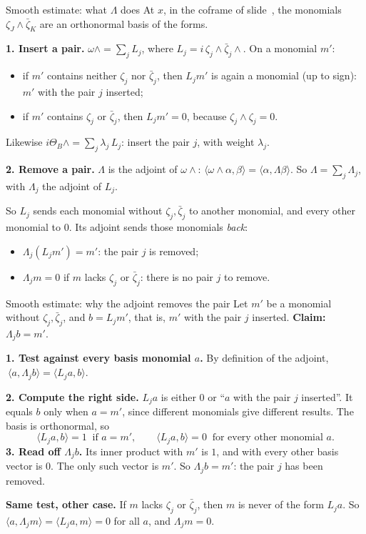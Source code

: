 \begin{frame}{Smooth estimate: what \(\Lambda\) does}
At \(x\), in the coframe of slide~\hyperlink{fr:kv-proof-both-forms-23}{\pageref{fr:kv-proof-both-forms-23}}, the monomials \(\zeta_J\wedge\bar\zeta_K\) are an orthonormal basis of the forms.
\par
\textbf{1. Insert a pair.} \(\omega\wedge=\sum_jL_j\), where \(L_j=i\,\zeta_j\wedge\bar\zeta_j\wedge\). On a monomial \(m'\):
\begin{itemize}
\item if \(m'\) contains neither \(\zeta_j\) nor \(\bar\zeta_j\), then \(L_jm'\) is again a monomial (up to sign): \(m'\) with the pair \(j\) inserted;
\item if \(m'\) contains \(\zeta_j\) or \(\bar\zeta_j\), then \(L_jm'=0\), because \(\zeta_j\wedge\zeta_j=0\).
\end{itemize}
Likewise \(i\Theta_B\wedge=\sum_j\lambda_j\,L_j\): insert the pair \(j\), with weight \(\lambda_j\).
\par\medskip
\textbf{2. Remove a pair.} \(\Lambda\) is the adjoint of \(\omega\wedge\): \(\langle\omega\wedge\alpha,\beta\rangle=\langle\alpha,\Lambda\beta\rangle\). So \(\Lambda=\sum_j\Lambda_j\), with \(\Lambda_j\) the adjoint of \(L_j\).
\par
So \(L_j\) sends each monomial without \(\zeta_j,\bar\zeta_j\) to another monomial, and every other monomial to \(0\). Its adjoint sends those monomials \emph{back}:
\begin{itemize}
\item \(\Lambda_j(L_jm')=m'\): the pair \(j\) is removed;
\item \(\Lambda_jm=0\) if \(m\) lacks \(\zeta_j\) or \(\bar\zeta_j\): there is no pair \(j\) to remove.
\end{itemize}
\end{frame}

\begin{frame}{Smooth estimate: why the adjoint removes the pair}
Let \(m'\) be a monomial without \(\zeta_j,\bar\zeta_j\), and \(b=L_jm'\), that is, \(m'\) with the pair \(j\) inserted.
\textbf{Claim:} \(\Lambda_jb=m'\).
\par\medskip
\textbf{1. Test against every basis monomial \(a\).} By definition of the adjoint,
\(\ \langle a,\Lambda_jb\rangle=\langle L_ja,b\rangle .\)
\par\medskip
\textbf{2. Compute the right side.} \(L_ja\) is either \(0\) or ``\(a\) with the pair \(j\) inserted''.
It equals \(b\) only when \(a=m'\), since different monomials give different results. The basis is orthonormal, so
\[
\langle L_ja,b\rangle=1\ \text{ if } a=m',
\qquad
\langle L_ja,b\rangle=0\ \text{ for every other monomial } a .
\]
\textbf{3. Read off \(\Lambda_jb\).} Its inner product with \(m'\) is \(1\), and with every other basis vector is \(0\). The only such vector is \(m'\). So \(\Lambda_jb=m'\): the pair \(j\) has been removed.
\par\medskip
\textbf{Same test, other case.} If \(m\) lacks \(\zeta_j\) or \(\bar\zeta_j\), then \(m\) is never of the form \(L_ja\). So \(\langle a,\Lambda_jm\rangle=\langle L_ja,m\rangle=0\) for all \(a\), and \(\Lambda_jm=0\).
\end{frame}

